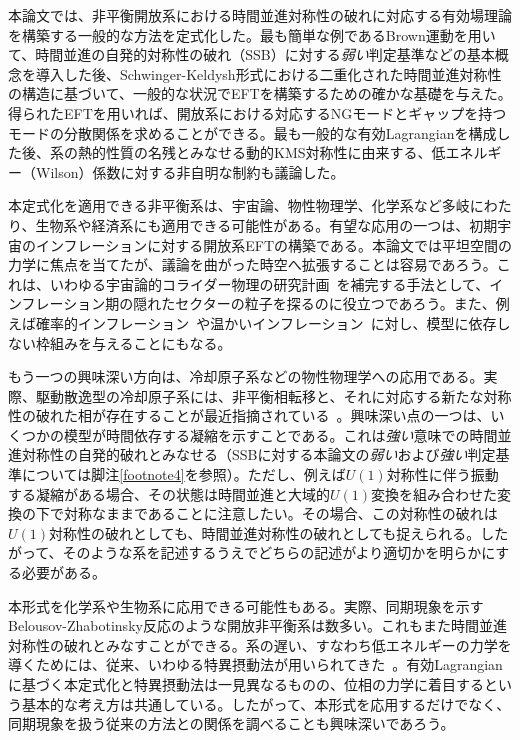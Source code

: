 \label{section:Summary}

本論文では、非平衡開放系における時間並進対称性の破れに対応する有効場理論を構築する一般的な方法を定式化した。最も簡単な例であるBrown運動を用いて、時間並進の自発的対称性の破れ（SSB）に対する\textit{弱い}判定基準などの基本概念を導入した後、Schwinger-Keldysh形式における二重化された時間並進対称性の構造に基づいて、一般的な状況でEFTを構築するための確かな基礎を与えた。得られたEFTを用いれば、開放系における対応するNGモードとギャップを持つモードの分散関係を求めることができる。最も一般的な有効Lagrangianを構成した後、系の熱的性質の名残とみなせる動的KMS対称性に由来する、低エネルギー（Wilson）係数に対する非自明な制約も議論した。

\medskip
本定式化を適用できる非平衡系は、宇宙論、物性物理学、化学系など多岐にわたり、生物系や経済系にも適用できる可能性がある。有望な応用の一つは、初期宇宙のインフレーションに対する開放系EFTの構築である。本論文では平坦空間の力学に焦点を当てたが、議論を曲がった時空へ拡張することは容易であろう。これは、いわゆる宇宙論的コライダー物理の研究計画~\cite{Chen:2009zp,Baumann:2011nk,Noumi:2012vr,Arkani-Hamed:2015bza}を補完する手法として、インフレーション期の隠れたセクターの粒子を探るのに役立つであろう。また、例えば確率的インフレーション~\cite{stochastic}や温かいインフレーション~\cite{Berera:1995ie}に対し、模型に依存しない枠組みを与えることにもなる。

\medskip
もう一つの興味深い方向は、冷却原子系などの物性物理学への応用である。実際、駆動散逸型の冷却原子系には、非平衡相転移と、それに対応する新たな対称性の破れた相が存在することが最近指摘されている~\cite{PhysRevLett.96.230602,PhysRevLett.99.140402,sieberer2016keldysh}。興味深い点の一つは、いくつかの模型が時間依存する凝縮を示すことである。これは\textit{強い}意味での時間並進対称性の自発的破れとみなせる（SSBに対する本論文の\textit{弱い}および\textit{強い}判定基準については脚注\ref{footnote4}を参照）。ただし、例えば$U(1)$対称性に伴う振動する凝縮がある場合、その状態は時間並進と大域的$U(1)$変換を組み合わせた変換の下で対称なままであることに注意したい。その場合、この対称性の破れは$U(1)$対称性の破れとしても、時間並進対称性の破れとしても捉えられる。したがって、そのような系を記述するうえでどちらの記述がより適切かを明らかにする必要がある。

\medskip
本形式を化学系や生物系に応用できる可能性もある。実際、同期現象を示すBelousov-Zhabotinsky反応のような開放非平衡系は数多い。これもまた時間並進対称性の破れとみなすことができる。系の遅い、すなわち低エネルギーの力学を導くためには、従来、いわゆる特異摂動法が用いられてきた~\cite{Kuramoto,MoriKuramoto}。有効Lagrangianに基づく本定式化と特異摂動法は一見異なるものの、位相の力学に着目するという基本的な考え方は共通している。したがって、本形式を応用するだけでなく、同期現象を扱う従来の方法との関係を調べることも興味深いであろう。

